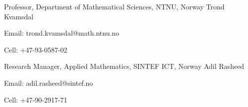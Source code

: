 

\begin{cventries}

  \cventry
    {Professor, Department of Mathematical Sciences, NTNU, Norway } %
    {Trond Kvamsdal} %
    {} %
    {} %
    {
      \begin{cvitems} %
        \item {Email: trond.kvamsdal@math.ntnu.no}
        \item {Cell: +47-93-0587-02}
      \end{cvitems}
    }

  \cventry
  {Research Manager, Applied Mathematics, SINTEF ICT, Norway} %
  {Adil Rasheed} %
  {} %
  {} %
  {
  	\begin{cvitems} %
  		\item {Email: adil.rasheed@sintef.no}
  		\item {Cell: +47-90-2917-71}
  	\end{cvitems}
  }


\end{cventries}
